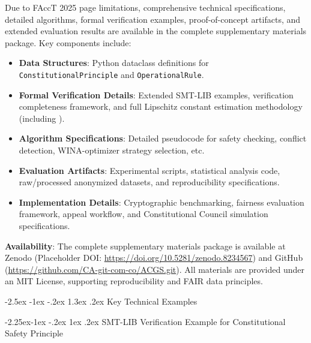 \documentclass[manuscript,screen,9pt]{acmart}
\makeatletter
\renewcommand\section{\@startsection{section}{1}{\z@}%
  {-2.5ex \@plus -1ex \@minus -.2ex}%
  {1.3ex \@plus.2ex}%
  {\normalfont\Large\bfseries}}
\renewcommand\subsection{\@startsection{subsection}{2}{\z@}%
  {-2.25ex\@plus -1ex \@minus -.2ex}%
  {1ex \@plus .2ex}%
  {\normalfont\large\bfseries}}
\makeatother
\begin{document}
Due to FAccT 2025 page limitations, comprehensive technical specifications, detailed algorithms, formal verification examples, proof-of-concept artifacts, and extended evaluation results are available in the complete supplementary materials package. Key components include:
\begin{itemize}[leftmargin=*,itemsep=1pt,parsep=1pt]
    \item \textbf{Data Structures}: Python dataclass definitions for \texttt{ConstitutionalPrinciple} and \texttt{OperationalRule}.
    \item \textbf{Formal Verification Details}: Extended SMT-LIB examples, verification completeness framework, and full Lipschitz constant estimation methodology (including ).
    \item \textbf{Algorithm Specifications}: Detailed pseudocode for safety checking, conflict detection, WINA-optimizer strategy selection, etc.
    \item \textbf{Evaluation Artifacts}: Experimental scripts, statistical analysis code, raw/processed anonymized datasets, and reproducibility specifications.
    \item \textbf{Implementation Details}: Cryptographic benchmarking, fairness evaluation framework, appeal workflow, and Constitutional Council simulation specifications.
\end{itemize}
\textbf{Availability}: The complete supplementary materials package is available at Zenodo (Placeholder DOI: \url{https://doi.org/10.5281/zenodo.8234567}) and GitHub (\url{https://github.com/CA-git-com-co/ACGS.git}). All materials are provided under an MIT License, supporting reproducibility and FAIR data principles.

\section{Key Technical Examples}
\label{app:key_examples}

\subsection{SMT-LIB Verification Example for Constitutional Safety Principle}
\label{subsubsec:smtlib_verification_example}
\end{document}
